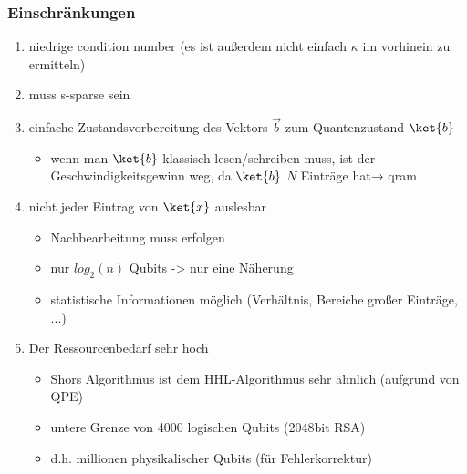 \begin{frame}
    \frametitle{Einschränkungen}
    \begin{enumerate}
        \item niedrige condition number (es ist außerdem nicht einfach $\kappa$ im vorhinein zu ermitteln)

        \item muss s-sparse sein

        \item einfache Zustandsvorbereitung des Vektors $\vec b$ zum Quantenzustand $\ket{b}$
            \begin{itemize}
                \item wenn man $\ket{b}$ klassisch lesen/schreiben muss, ist der Geschwindigkeitsgewinn weg, da $\ket{b}$ $N$ Einträge hat→ qram
            \end{itemize}
        \item nicht jeder Eintrag von $\ket{x}$ auslesbar
            \begin{itemize}
                \item Nachbearbeitung muss erfolgen
                \item nur $log_2(n)$ Qubits -> nur eine Näherung
                \item statistische Informationen möglich (Verhältnis, Bereiche großer Einträge, ...)
            \end{itemize}
 
        \item Der Ressourcenbedarf sehr hoch
            \begin{itemize}
                \item Shors Algorithmus ist dem HHL-Algorithmus sehr ähnlich (aufgrund von QPE)
                \item untere Grenze von 4000 logischen Qubits (2048bit RSA)
                \item d.h. millionen physikalischer Qubits (für Fehlerkorrektur)
            \end{itemize}
    \end{enumerate}

\end{frame}

